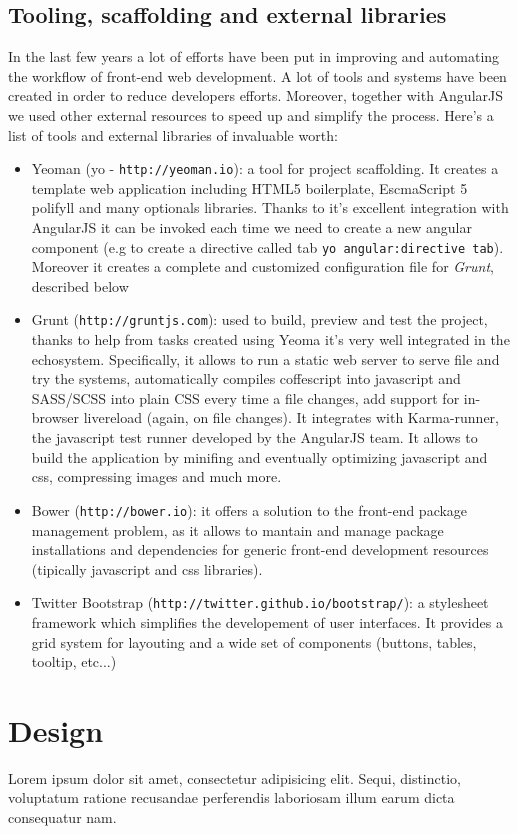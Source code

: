 \documentclass[a4paper,12pt]{report}
\begin{document}
\subsection{Tooling, scaffolding and external libraries}
In the last few years a lot of efforts have been put in improving and automating the workflow of front-end web development. A lot of tools and systems have been created in order to reduce developers efforts. 
Moreover, together with AngularJS we used other external resources to speed up and simplify the process. Here's a list of tools and external libraries of invaluable worth:
\begin{itemize}
\item Yeoman (yo - \texttt{http://yeoman.io}): a tool for project scaffolding. It creates a template web application including HTML5 boilerplate, EscmaScript 5 polifyll and many optionals libraries. Thanks to it's excellent integration with AngularJS it can be invoked each time we need to create a new angular component (e.g to create a directive called tab \texttt{yo angular:directive tab}). Moreover it creates a complete and customized configuration file for \emph{Grunt}, described below
\item Grunt (\texttt{http://gruntjs.com}): used to build, preview and test the project, thanks to help from tasks created using Yeoma it's very well integrated in the echosystem. Specifically, it allows to run a static web server to serve file and try the systems, automatically compiles coffescript into javascript and SASS/SCSS into plain CSS every time a file changes, add support for in-browser livereload (again, on file changes). It integrates with Karma-runner, the javascript test runner developed by the AngularJS team. It allows to build the application by minifing and eventually optimizing javascript and css, compressing images and much more.
\item Bower (\texttt{http://bower.io}): it offers a solution to the front-end package management problem, as it allows to mantain and manage package installations and dependencies for generic front-end development resources (tipically javascript and css libraries). 
\item Twitter Bootstrap (\texttt{http://twitter.github.io/bootstrap/}): a stylesheet framework which simplifies the developement of user interfaces. It provides a grid system for layouting and a wide set of components (buttons, tables, tooltip, etc...) 
\end{itemize}
\section{Design}
Lorem ipsum dolor sit amet, consectetur adipisicing elit. Sequi, distinctio, voluptatum ratione recusandae perferendis laboriosam illum earum dicta consequatur nam.
\end{document}

